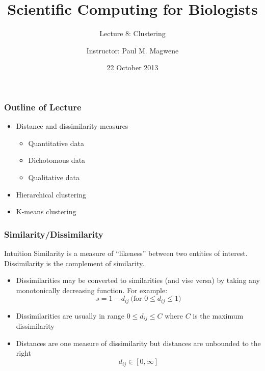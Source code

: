 \documentclass{beamer}
\title{Scientific Computing for Biologists}
\subtitle{Lecture 8: Clustering}
\author{Instructor: Paul M. Magwene}
\date{22 October 2013}
\begin{document}
\begin{frame}
\titlepage
\end{frame}



\begin{frame}
  \frametitle{Outline of Lecture}
  
\begin{itemize}
    \item Distance and dissimilarity measures
    \begin{itemize}
        \item Quantitative data
        \item Dichotomous data
        \item Qualitative data
    \end{itemize}
    \item Hierarchical clustering
    \item K-means clustering
\end{itemize}     
  
\end{frame}

\begin{frame}
  \frametitle{Similarity/Dissimilarity}

\begin{block}{Intuition}
Similarity is a measure of ``likeness'' between two entities of interest. Dissimilarity is the complement of similarity.
\end{block}


\begin{itemize}
\item Dissimilarities may be converted to similarities (and vise versa) by taking any monotonically decreasing function. For example:
\[
s = 1 - d_{ij}  \ \mbox{(for $0 \leq d_{ij} \leq 1$)}
\]
\item Dissimilarities are usually in range $0 \leq d_{ij} \leq C$ where $C$ is the maximum dissimilarity
\item Distances are one measure of dissimilarity but distances are unbounded to the right
\[
d_{ij} \in [0,\infty]
\]
\end{itemize}
\end{frame}
\end{document}
